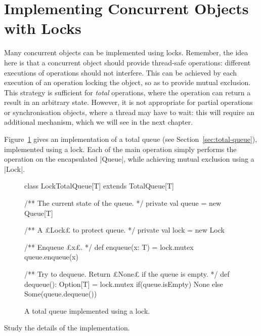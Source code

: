 
\section{Implementing Concurrent Objects with Locks}
\label{sec:concurrent-objects-locks}

Many concurrent objects can be implemented using locks.  Remember, the idea
here is that a concurrent object should provide thread-safe operations:
different executions of operations should not interfere.  This can be achieved
by each execution of an operation locking the object, so as to provide mutual
exclusion.  This strategy is sufficient for \emph{total}  operations, where
the operation can return a result in an arbitrary state.  However, it is not
appropriate for partial operations or synchronisation objects, where a thread
may have to wait: this will require an additional mechanism, which we will see
in the next chapter.

Figure~\ref{fig:LockTotalQueue} gives an implementation of a total queue (see
Section~\ref{sec:total-queue}), implemented using a lock.  Each of the main
operation simply performs the operation on the encapsulated |Queue|, while
achieving mutual exclusion using a |Lock|.  


\begin{figure}
\begin{scala}
class LockTotalQueue[T] extends TotalQueue[T]{
  /** The current state of the queue. */
  private val queue = new Queue[T]

  /** A £Lock£ to protect queue. */
  private val lock = new Lock

  /** Enqueue £x£. */
  def enqueue(x: T) = lock.mutex{ queue.enqueue(x) }

  /** Try to dequeue.  Return £None£ if the queue is empty. */
  def dequeue(): Option[T] = lock.mutex{ 
    if(queue.isEmpty) None else Some(queue.dequeue()) 
  }
}
\end{scala}
\caption{A total queue implemented using a lock.}
\label{fig:LockTotalQueue}
\end{figure}


\begin{instruction}
Study the details of the implementation.
\end{instruction}

